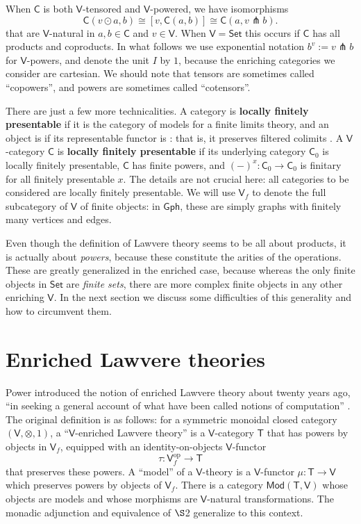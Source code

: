 \documentclass{amsart}
\newcommand{\define}[1]{{\bf \boldmath{#1}}}
\theoremstyle{definition}
\newcommand{\Gph}{\mathsf{Gph}}
\newcommand{\Set}{\mathsf{Set}}
\newcommand{\Mod}{\mathsf{Mod}}
\newcommand{\V}{\mathsf{V}}
\newcommand{\C}{\mathsf{C}}
\newcommand{\T}{\mathsf{T}}
\newcommand{\op}{\mathrm{op}}
\newcommand{\pfk}{\pitchfork}
\newcommand{\maps}{\colon}
\begin{document}
When $\C$ is both $\V$-tensored and $\V$-powered, we have isomorphisms
\begin{equation}\label{eq:co-power}
	\C(v\odot a,b) \cong \left[v, \C(a,b)\right] \cong \C(a,v \pfk b).
\end{equation}
that are  $\V$-natural in $a,b \in \C$ and $v \in \V$.  When $\V = \Set$ this occurs if $\C$ has all products and coproducts.    In what follows we use exponential notation $b^v := v\pfk b$ for $\V$-powers, and denote the unit $I$ by $1$, because the enriching categories we consider are cartesian.  We should note that tensors are sometimes called ``copowers'', and powers are sometimes called ``cotensors''.

There are just a few more technicalities. A category is \textbf{locally finitely presentable} if it is the category of models for a finite limits theory, and an object is \define{finite} if its representable functor is \define{finitary}: that is, it preserves filtered colimits \cite{adamekrosicky}.   A $\V$-category $\C$ is \textbf{locally finitely presentable} if its underlying category $\C_0$ is locally finitely presentable, $\C$ has finite powers, and $(-)^x\maps \C_0 \to \C_0$ is finitary for all finitely presentable $x$.  The details are not crucial here: all categories to be considered are locally finitely presentable. We will use  $\V_f$ to denote the full subcategory of $\V$ of finite objects: in $\Gph$, these are simply graphs with finitely many vertices and edges.

Even though the definition of Lawvere theory seems to be all about products, it is actually about \textit{powers}, because these constitute the arities of the operations. These are greatly generalized in the enriched case, because whereas the only finite objects in $\Set$ are \textit{finite sets}, there are more complex finite objects in any other enriching $\V$.  In the next section we discuss some difficulties of this generality and how to circumvent them.

\section{Enriched Lawvere theories}

Power introduced the notion of enriched Lawvere theory about twenty years ago, ``in seeking a general account of what have been called notions of computation'' \cite{power}. The original definition is as follows: for a symmetric monoidal closed category $(\V,\otimes,1)$, a ``$\V$-enriched Lawvere theory'' is a $\V$-category $\T$ that has powers by objects in $\V_f$, equipped with an identity-on-objects $\V$-functor 
\[  \tau\maps\V_f^\op \to \T \]
that preserves these powers.  A ``model'' of a $\V$-theory is a $\V$-functor $\mu\maps\T \to \V$ which preserves powers by objects of $\V_f$.  There is a category $\Mod(\T,\V)$ whose objects are models and whose morphisms are $\V$-natural transformations. The monadic adjunction and equivalence of $\S$2 generalize to this context.
\end{document}
